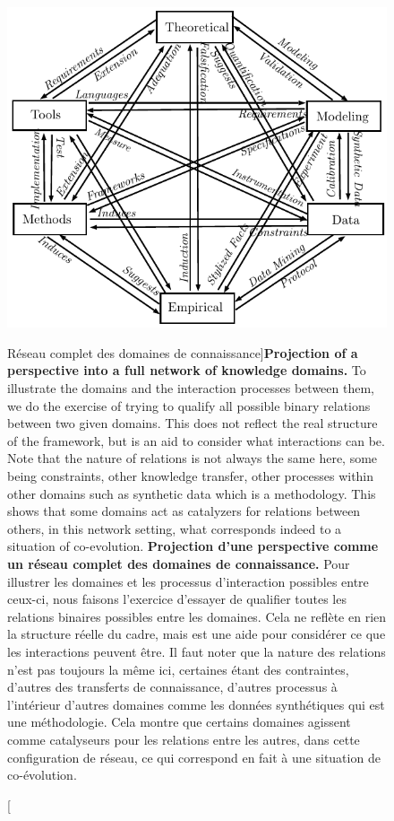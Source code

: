 \begin{figure}[h!]
\centering
\begin{adjustwidth}{-2cm}{-2cm}
\includegraphics[width=\linewidth]{Figures/KnowledgeFramework/framework}
\caption[Full network of knowledge domains][Réseau complet des domaines de connaissance]{\textbf{Projection of a perspective into a full network of knowledge domains.} To illustrate the domains and the interaction processes between them, we do the exercise of trying to qualify all possible binary relations between two given domains. This does not reflect the real structure of the framework, but is an aid to consider what interactions can be. Note that the nature of relations is not always the same here, some being constraints, other knowledge transfer, other processes within other domains such as synthetic data which is a methodology. This shows that some domains act as catalyzers for relations between others, in this network setting, what corresponds indeed to a situation of co-evolution.
}{\textbf{Projection d'une perspective comme un réseau complet des domaines de connaissance.} Pour illustrer les domaines et les processus d'interaction possibles entre ceux-ci, nous faisons l'exercice d'essayer de qualifier toutes les relations binaires possibles entre les domaines. Cela ne reflète en rien la structure réelle du cadre, mais est une aide pour considérer ce que les interactions peuvent être. Il faut noter que la nature des relations n'est pas toujours la même ici, certaines étant des contraintes, d'autres des transferts de connaissance, d'autres processus à l'intérieur d'autres domaines comme les données synthétiques qui est une méthodologie. Cela montre que certains domaines agissent comme catalyseurs pour les relations entre les autres, dans cette configuration de réseau, ce qui correspond en fait à une situation de co-évolution.}
\label{fig:knowledgeframework:fwk}
\end{adjustwidth}
\end{figure}




